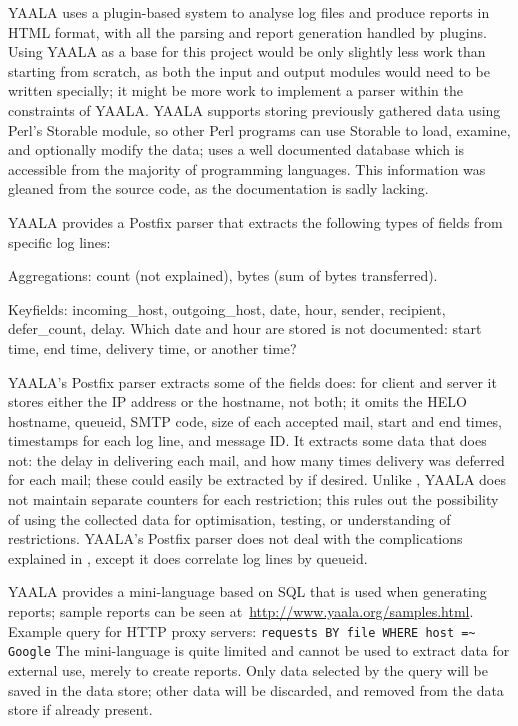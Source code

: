 YAALA uses a plugin-based system to analyse log files and produce reports
in HTML format, with all the parsing and report generation handled by
plugins.  Using YAALA as a base for this project would be only slightly
less work than starting from scratch, as both the input and output modules
would need to be written specially; it might be more work to implement a
parser within the constraints of YAALA\@.  YAALA supports storing
previously gathered data using Perl's Storable module, so other Perl
programs can use Storable to load, examine, and optionally modify the data;
\parsername{} uses a well documented database which is accessible from the
majority of programming languages.  This information was gleaned from the
source code, as the documentation is sadly lacking.

YAALA provides a Postfix parser that extracts the following types of fields
from specific log lines:

\begin{eqlist}

    \item [Aggregations:] count (not explained), bytes (sum of bytes
        transferred).

    \item [Keyfields:] incoming\_host, outgoing\_host, date, hour, sender,
        recipient, defer\_count, delay.  Which date and hour are stored is
        not documented: start time, end time, delivery time, or another
        time?

\end{eqlist}

\noindent{}YAALA's Postfix parser extracts some of the fields \parsername{}
does: for client and server it stores either the \gls{IP} address or the
hostname, not both; it omits the HELO hostname, queueid, \gls{SMTP} code,
size of each accepted mail, start and end times, timestamps for each log
line, and message ID\@.  It extracts some data that \parsername{} does not:
the delay in delivering each mail, and how many times delivery was deferred
for each mail; these could easily be extracted by \parsername{} if desired.
Unlike \parsername{}, YAALA does not maintain separate counters for each
restriction; this rules out the possibility of using the collected data for
optimisation, testing, or understanding of restrictions.  YAALA's Postfix
parser does not deal with the complications explained in
, except it does correlate log lines by queueid.

YAALA provides a mini-language based on \gls{SQL} that is used when
generating reports; sample reports can be seen
at~\url{http://www.yaala.org/samples.html}.  Example query for HTTP proxy
servers: \newline{} \tab{} \texttt{requests BY file WHERE host =\~{}
Google} \newline{} The mini-language is quite limited and cannot be used to
extract data for external use, merely to create reports.  Only data
selected by the query will be saved in the data store; other data will be
discarded, and removed from the data store if already present.

